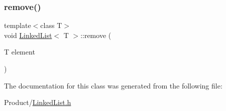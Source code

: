 \mbox{\label{classLinkedList_a6c4973ae9956ddb037a9093cffa2adb1}} 
\subsubsection{\texorpdfstring{remove()}{remove()}}
{\footnotesize\ttfamily template$<$class T$>$ \\
void \mbox{\hyperlink{classLinkedList}{Linked\+List}}$<$ T $>$\+::remove (\begin{DoxyParamCaption}\item[{T}]{element }\end{DoxyParamCaption})}



The documentation for this class was generated from the following file\+:\begin{DoxyCompactItemize}
\item 
Product/\mbox{\hyperlink{LinkedList_8h}{Linked\+List.\+h}}\end{DoxyCompactItemize}

